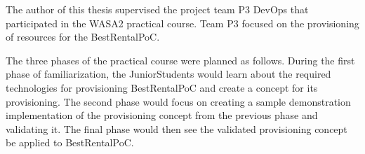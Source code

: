 The author of this thesis supervised the project team P3 DevOps that participated in the
WASA2 practical course. Team P3 focused on the provisioning of resources for the BestRentalPoC.








The three phases of the practical course were planned as follows.
During the first phase of familiarization, the JuniorStudents would learn about the required
technologies for provisioning BestRentalPoC and create a concept for its provisioning.
The second phase would focus on creating a sample demonstration implementation
of the provisioning concept from the previous phase and validating it.
The final phase would then see the validated provisioning concept be applied to BestRentalPoC.

